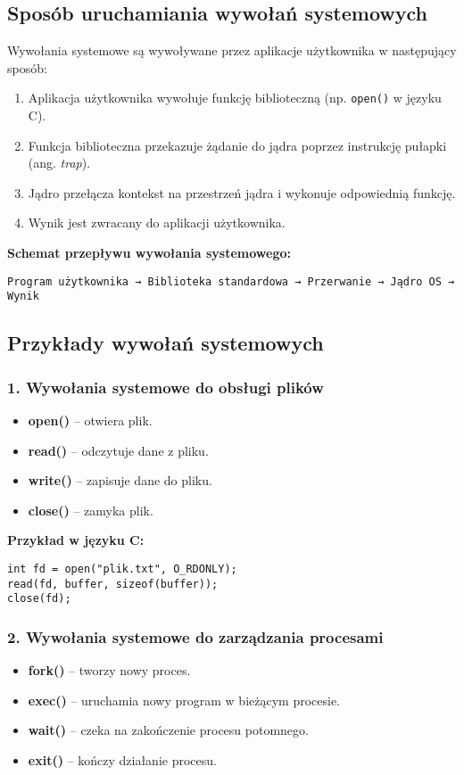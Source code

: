 \subsection{Sposób uruchamiania wywołań systemowych}
Wywołania systemowe są wywoływane przez aplikacje użytkownika w następujący sposób:
\begin{enumerate}
    \item Aplikacja użytkownika wywołuje funkcję biblioteczną (np. \texttt{open()} w języku C).
    \item Funkcja biblioteczna przekazuje żądanie do jądra poprzez instrukcję pułapki (ang. \textit{trap}).
    \item Jądro przełącza kontekst na przestrzeń jądra i wykonuje odpowiednią funkcję.
    \item Wynik jest zwracany do aplikacji użytkownika.
\end{enumerate}

\textbf{Schemat przepływu wywołania systemowego:}
\begin{verbatim}
Program użytkownika → Biblioteka standardowa → Przerwanie → Jądro OS → Wynik
\end{verbatim}

\subsection{Przykłady wywołań systemowych}

\subsubsection{1. Wywołania systemowe do obsługi plików}
\begin{itemize}
    \item \textbf{open()} – otwiera plik.
    \item \textbf{read()} – odczytuje dane z pliku.
    \item \textbf{write()} – zapisuje dane do pliku.
    \item \textbf{close()} – zamyka plik.
\end{itemize}

\textbf{Przykład w języku C:}
\begin{verbatim}
int fd = open("plik.txt", O_RDONLY);
read(fd, buffer, sizeof(buffer));
close(fd);
\end{verbatim}

\subsubsection{2. Wywołania systemowe do zarządzania procesami}
\begin{itemize}
    \item \textbf{fork()} – tworzy nowy proces.
    \item \textbf{exec()} – uruchamia nowy program w bieżącym procesie.
    \item \textbf{wait()} – czeka na zakończenie procesu potomnego.
    \item \textbf{exit()} – kończy działanie procesu.
\end{itemize}

